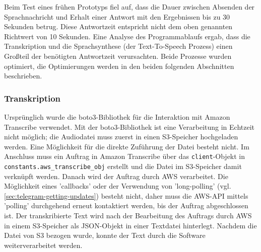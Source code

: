 Beim Test eines frühen Prototyps fiel auf, dass die Dauer zwischen Absenden der Sprachnachricht und Erhalt einer Antwort mit den Ergebnissen bis zu 30 Sekunden betrug. Diese Antwortzeit entspricht nicht dem oben genannten Richtwert von 10 Sekunden. Eine Analyse des Programmablaufs ergab, dass die Transkription und die Sprachsynthese (der Text-To-Speech Prozess) einen Großteil der benötigten Antwortzeit verursachten. Beide Prozesse wurden optimiert, die Optimierungen werden in den beiden folgenden Abschnitten beschrieben.

\subsubsection{Transkription}
\label{sec:optimierung-transk}

Ursprünglich wurde die boto3-Bibliothek für die Interaktion mit Amazon Transcribe verwendet. Mit der boto3-Bibliothek ist eine Verarbeitung in Echtzeit nicht möglich; die Audiodatei muss zuerst in einen S3-Speicher hochgeladen werden. Eine Möglichkeit für die direkte Zuführung der Datei besteht nicht. Im Anschluss muss ein Auftrag in Amazon Transcribe über das \lstinline{client}-Objekt in \lstinline{constants.aws_transcribe_obj} erstellt und die Datei im S3-Speicher damit verknüpft werden. Danach wird der Auftrag durch AWS verarbeitet. Die Möglichkeit eines 'callbacks' oder der Verwendung von 'long-polling' (vgl. \autoref{sec:telegram-getting-updates}) besteht nicht, daher muss die AWS-API mittels 'polling' durchgehend erneut kontaktiert werden, bis der Auftrag abgeschlossen ist. Der transkribierte Text wird nach der Bearbeitung des Auftrags durch AWS in einem S3-Speicher als JSON-Objekt in einer Textdatei hinterlegt. Nachdem die Datei von S3 bezogen wurde, konnte der Text durch die Software weiterverarbeitet werden.

